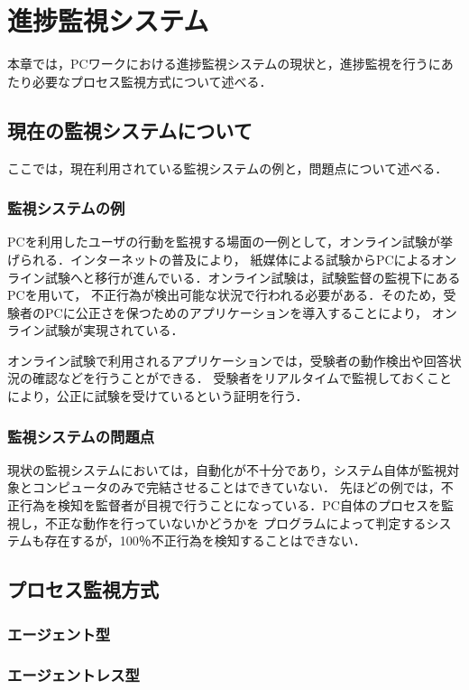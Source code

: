 \chapter{進捗監視システム}

本章では，PCワークにおける進捗監視システムの現状と，進捗監視を行うにあたり必要なプロセス監視方式について述べる．

\section{現在の監視システムについて}

ここでは，現在利用されている監視システムの例と，問題点について述べる．

\subsection{監視システムの例}
PCを利用したユーザの行動を監視する場面の一例として，オンライン試験が挙げられる．インターネットの普及により，
紙媒体による試験からPCによるオンライン試験へと移行が進んでいる．オンライン試験は，試験監督の監視下にあるPCを用いて，
不正行為が検出可能な状況で行われる必要がある．そのため，受験者のPCに公正さを保つためのアプリケーションを導入することにより，
オンライン試験が実現されている．

オンライン試験で利用されるアプリケーションでは，受験者の動作検出や回答状況の確認などを行うことができる．
受験者をリアルタイムで監視しておくことにより，公正に試験を受けているという証明を行う．

\subsection{監視システムの問題点}
現状の監視システムにおいては，自動化が不十分であり，システム自体が監視対象とコンピュータのみで完結させることはできていない．
先ほどの例では，不正行為を検知を監督者が目視で行うことになっている．PC自体のプロセスを監視し，不正な動作を行っていないかどうかを
プログラムによって判定するシステムも存在するが，100％不正行為を検知することはできない．

\section{プロセス監視方式}

\subsection{エージェント型}

\subsection{エージェントレス型}




